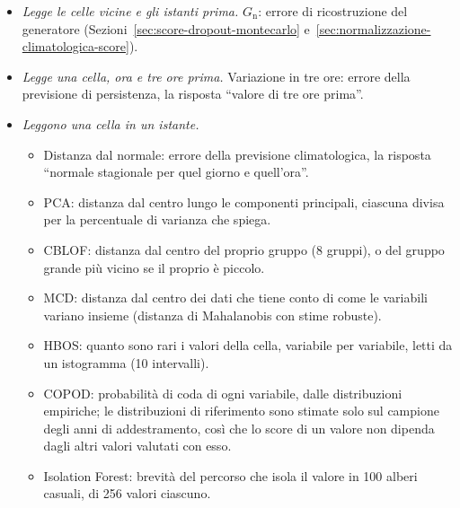 \begin{itemize}
    \item \emph{Legge le celle vicine e gli istanti prima.} $G_{\mathrm{n}}$: errore di ricostruzione del generatore (Sezioni~\ref{sec:score-dropout-montecarlo} e~\ref{sec:normalizzazione-climatologica-score}).
    \item \emph{Legge una cella, ora e tre ore prima.} Variazione in tre ore: errore della previsione di persistenza, la risposta ``valore di tre ore prima''.
    \item \emph{Leggono una cella in un istante.}
    \begin{itemize}
        \item Distanza dal normale: errore della previsione climatologica, la risposta ``normale stagionale per quel giorno e quell'ora''.
        \item PCA: distanza dal centro lungo le componenti principali, ciascuna divisa per la percentuale di varianza che spiega.
        \item CBLOF: distanza dal centro del proprio gruppo (8 gruppi), o del gruppo grande più vicino se il proprio è piccolo.
        \item MCD: distanza dal centro dei dati che tiene conto di come le variabili variano insieme (distanza di Mahalanobis con stime robuste).
        \item HBOS: quanto sono rari i valori della cella, variabile per variabile, letti da un istogramma (10 intervalli).
        \item COPOD: probabilità di coda di ogni variabile, dalle distribuzioni empiriche; le distribuzioni di riferimento sono stimate solo sul campione degli anni di addestramento, così che lo score di un valore non dipenda dagli altri valori valutati con esso.
        \item Isolation Forest: brevità del percorso che isola il valore in 100 alberi casuali, di 256 valori ciascuno.
    \end{itemize}
\end{itemize}

